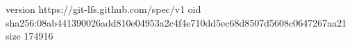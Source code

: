 version https://git-lfs.github.com/spec/v1
oid sha256:08ab441390026add810e04953a2c4f4e710dd5ec68d8507d5608c0647267aa21
size 174916
